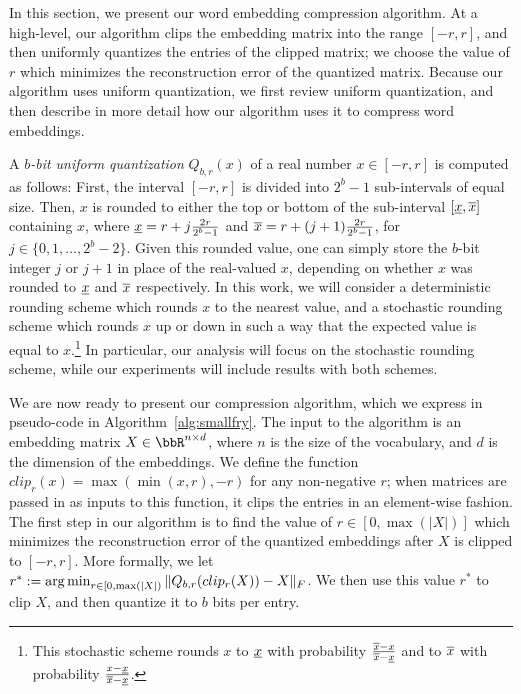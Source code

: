 In this section, we present our word embedding compression algorithm.
At a high-level, our algorithm clips the embedding matrix into the range $[-r,r]$, and then uniformly quantizes the entries of the clipped matrix;
we choose the value of $r$ which minimizes the reconstruction error of the quantized matrix.
Because our algorithm uses uniform quantization, we first review uniform quantization, and then describe in more detail how our algorithm uses it to compress word embeddings.

A \textit{$b$-bit uniform quantization} $Q_{b,r}(x)$ of a real number $x \in [-r,r]$ is computed as follows:
First, the interval $[-r,r]$ is divided into $2^b - 1$ sub-intervals of equal size.
Then, $x$ is rounded to either the top or bottom of the sub-interval $[\ulx,\olx]$ containing $x$, where $\ulx = r + j\frac{2r}{2^b-1}$ and $\olx = r + (j+1)\frac{2r}{2^b-1}$, for $j\in\{0,1,\ldots,2^b-2\}$.
Given this rounded value, one can simply store the $b$-bit integer $j$ or $j+1$ in place of the real-valued $x$, depending on whether $x$ was rounded to $\ulx$ and $\olx$ respectively.
In this work, we will consider a deterministic rounding scheme which rounds $x$ to the nearest value, and a stochastic rounding scheme which rounds $x$ up or down in such a way that the expected value is equal to $x$.\footnote{
	This stochastic scheme rounds $x$ to $\ulx$ with probability $\frac{\olx-x}{\olx-\ulx}$ and to $\olx$ with probability $\frac{x-\ulx}{\olx-\ulx}$.
}
In particular, our analysis will focus on the stochastic rounding scheme, while our experiments will include results with both schemes.


We are now ready to present our compression algorithm, which we express in pseudo-code in Algorithm~\ref{alg:smallfry}.
The input to the algorithm is an embedding matrix $X \in \RR^{n\times d}$, where $n$ is the size of the vocabulary, and $d$ is the dimension of the embeddings.
We define the function $clip_r(x) = \max(\min(x,r),-r)$ for any non-negative $r$; when matrices are passed in as inputs to this function, it clips the entries in an element-wise fashion.
The first step in our algorithm is to find the value of $r \in [0,\max(|X|)]$ which minimizes the reconstruction error of the quantized embeddings after $X$ is clipped to $[-r,r]$.
More formally, we let $r^* \defeq \argmin_{r \in [0,\max(|X|)} \|Q_{b,r}(clip_r(X))-X\|_F$.
We then use this value $r^*$ to clip $X$, and then quantize it to $b$ bits per entry.

